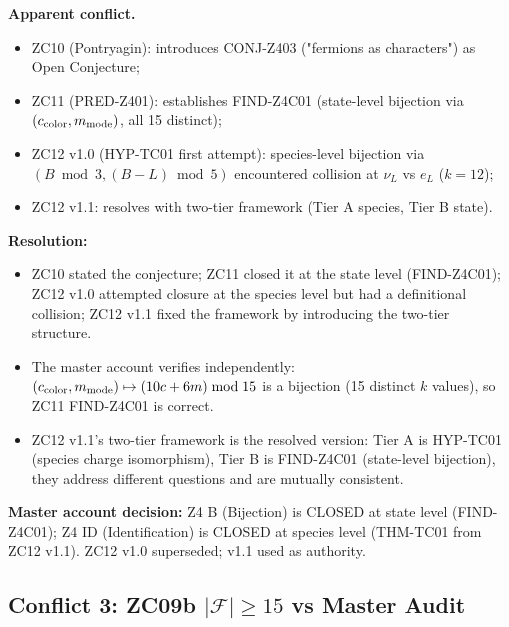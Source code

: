 \documentclass[12pt, a4paper]{article}
\begin{document}
\begin{formalbox}[title={Conflict 2 — Z4 bijection conjectural vs valid}]
\textbf{Apparent conflict.}
\begin{itemize}[leftmargin=*, noitemsep]
  \item ZC10 (Pontryagin): introduces CONJ-Z403 ("fermions as
    characters") as Open Conjecture;
  \item ZC11 (PRED-Z401): establishes FIND-Z4C01 (state-level
    bijection via $(c_{\rm color}, m_{\rm mode})$, all 15 distinct);
  \item ZC12 v1.0 (HYP-TC01 first attempt): species-level bijection
    via $(B \bmod 3, (B-L) \bmod 5)$ encountered collision at $\nu_L$
    vs $e_L$ ($k = 12$);
  \item ZC12 v1.1: resolves with two-tier framework (Tier A species,
    Tier B state).
\end{itemize}

\textbf{Resolution:}
\begin{itemize}[leftmargin=*, noitemsep]
  \item ZC10 stated the conjecture; ZC11 closed it at the state level
    (FIND-Z4C01); ZC12 v1.0 attempted closure at the species level
    but had a definitional collision; ZC12 v1.1 fixed the framework
    by introducing the two-tier structure.
  \item The master account verifies independently:
    $(c_{\rm color}, m_{\rm mode}) \mapsto (10c + 6m) \bmod 15$
    is a bijection (15 distinct $k$ values), so ZC11 FIND-Z4C01 is
    correct.
  \item ZC12 v1.1's two-tier framework is the resolved version:
    Tier A is HYP-TC01 (species charge isomorphism), Tier B is
    FIND-Z4C01 (state-level bijection), they address different
    questions and are mutually consistent.
\end{itemize}

\textbf{Master account decision:} Z4 B (Bijection) is CLOSED at state
level (FIND-Z4C01); Z4 ID (Identification) is CLOSED at species level
(THM-TC01 from ZC12 v1.1). ZC12 v1.0 superseded; v1.1 used as authority.
\end{formalbox}

\subsection{Conflict 3: ZC09b $|\mathcal{F}| \geq 15$ vs Master Audit}
\end{document}
